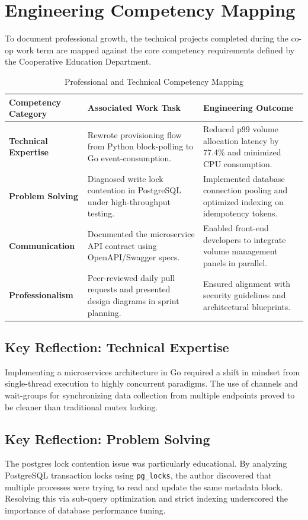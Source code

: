 \section{Engineering Competency Mapping}
\label{sec:competency_mapping}

To document professional growth, the technical projects completed during the co-op work term are mapped against the core competency requirements defined by the Cooperative Education Department.

\begin{table}[htbp]
\centering
\caption{Professional and Technical Competency Mapping}
\label{tab:competencies}
\begin{tabularx}{\textwidth}{l p{5cm} X}
\toprule
\textbf{Competency Category} & \textbf{Associated Work Task} & \textbf{Engineering Outcome} \\
\midrule
\textbf{Technical Expertise} & Rewrote provisioning flow from Python block-polling to Go event-consumption. & Reduced p99 volume allocation latency by 77.4\% and minimized CPU consumption. \\
\midrule
\textbf{Problem Solving} & Diagnosed write lock contention in PostgreSQL under high-throughput testing. & Implemented database connection pooling and optimized indexing on idempotency tokens. \\
\midrule
\textbf{Communication} & Documented the microservice API contract using OpenAPI/Swagger specs. & Enabled front-end developers to integrate volume management panels in parallel. \\
\midrule
\textbf{Professionalism} & Peer-reviewed daily pull requests and presented design diagrams in sprint planning. & Ensured alignment with security guidelines and architectural blueprints. \\
\bottomrule
\end{tabularx}
\end{table}

\subsection{Key Reflection: Technical Expertise}
Implementing a microservices architecture in Go required a shift in mindset from single-thread execution to highly concurrent paradigms. The use of channels and wait-groups for synchronizing data collection from multiple endpoints proved to be cleaner than traditional mutex locking.

\subsection{Key Reflection: Problem Solving}
The postgres lock contention issue was particularly educational. By analyzing PostgreSQL transaction locks using \texttt{pg\_locks}, the author discovered that multiple processes were trying to read and update the same metadata block. Resolving this via sub-query optimization and strict indexing underscored the importance of database performance tuning.
